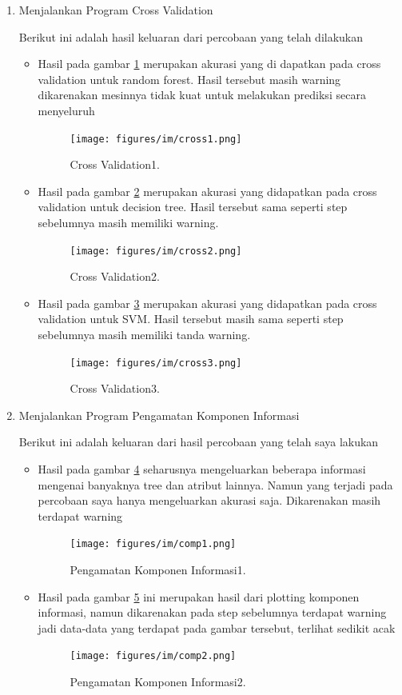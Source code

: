 \begin{enumerate}
\item Menjalankan Program Cross Validation \par
Berikut ini adalah hasil keluaran dari percobaan yang telah dilakukan
\begin{itemize}
\item Hasil pada gambar \ref{cross1} merupakan akurasi yang di dapatkan pada cross validation untuk random forest. Hasil tersebut masih warning dikarenakan mesinnya tidak kuat untuk melakukan prediksi secara menyeluruh
 		\begin{figure}[ht]
		\centerline{\texttt{[image: figures/im/cross1.png]}}
		\caption{Cross Validation1.}
		\label{cross1}
		\end{figure}

\item Hasil pada gambar \ref{cross2} merupakan akurasi yang didapatkan pada cross validation untuk decision tree. Hasil tersebut sama seperti step sebelumnya masih memiliki warning.
 		\begin{figure}[ht]
		\centerline{\texttt{[image: figures/im/cross2.png]}}
		\caption{Cross Validation2.}
		\label{cross2}
		\end{figure}

\item Hasil pada gambar \ref{cross3} merupakan akurasi yang didapatkan pada cross validation untuk SVM. Hasil tersebut masih sama seperti step sebelumnya masih memiliki tanda warning.
 		\begin{figure}[ht]
		\centerline{\texttt{[image: figures/im/cross3.png]}}
		\caption{Cross Validation3.}
		\label{cross3}
		\end{figure}
\end{itemize}

\item Menjalankan Program Pengamatan Komponen Informasi \par
Berikut ini adalah keluaran dari hasil percobaan yang telah saya lakukan
\begin{itemize}
\item Hasil pada gambar \ref{comp1} seharusnya mengeluarkan beberapa informasi mengenai banyaknya tree dan atribut lainnya. Namun yang terjadi pada percobaan saya hanya mengeluarkan akurasi saja. Dikarenakan masih terdapat warning
 		\begin{figure}[ht]
		\centerline{\texttt{[image: figures/im/comp1.png]}}
		\caption{Pengamatan Komponen Informasi1.}
		\label{comp1}
		\end{figure}

\item Hasil pada gambar \ref{comp2} ini merupakan hasil dari plotting komponen informasi, namun dikarenakan pada step sebelumnya terdapat warning jadi data-data yang terdapat pada gambar tersebut, terlihat sedikit acak
 		\begin{figure}[ht]
		\centerline{\texttt{[image: figures/im/comp2.png]}}
		\caption{Pengamatan Komponen Informasi2.}
		\label{comp2}
		\end{figure}
\end{itemize}
\end{enumerate}

